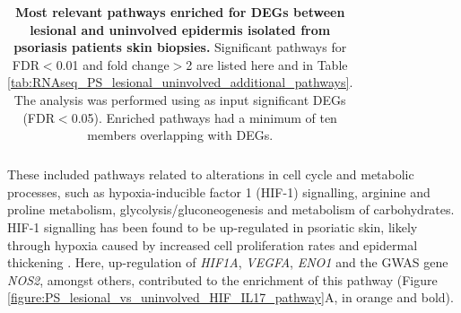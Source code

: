 \begin{table}[htbp]
\begin{tabular}{@{}c c c}
\bottomrule
\end{tabular}
\medskip %
\caption[Most relevant pathways enriched for DEGs between lesional and uninvolved epidermis isolated from psoriasis patients skin biopsies.]{\textbf{Most relevant pathways enriched for DEGs between lesional and uninvolved epidermis isolated from psoriasis patients skin biopsies.} Significant pathways for FDR$<$0.01 and fold change$>$2 are listed here and in Table \ref{tab:RNAseq_PS_lesional_uninvolved_additional_pathways}. The analysis was performed using as input significant DEGs (FDR$<$0.05). Enriched pathways had a minimum of ten members overlapping with DEGs.}
\label{tab:RNAseq_PS_lesional_uninvolved_pathway_enrichment}
\end{table}


These included pathways related to alterations in cell cycle and metabolic processes, such as hypoxia-inducible factor 1 (HIF-1) signalling, arginine and proline metabolism, glycolysis/gluconeogenesis and metabolism of carbohydrates. %
HIF-1 signalling has been found to be up-regulated in psoriatic skin, likely through hypoxia caused by increased cell proliferation rates and epidermal thickening \parencite{Rosenberger2007}. Here, up-regulation of \textit{HIF1A}, \textit{VEGFA}, \textit{ENO1} and the GWAS gene \textit{NOS2}, amongst others, contributed to the enrichment of this pathway (Figure \ref{figure:PS_lesional_vs_uninvolved_HIF_IL17_pathway}A, in orange and bold). 





